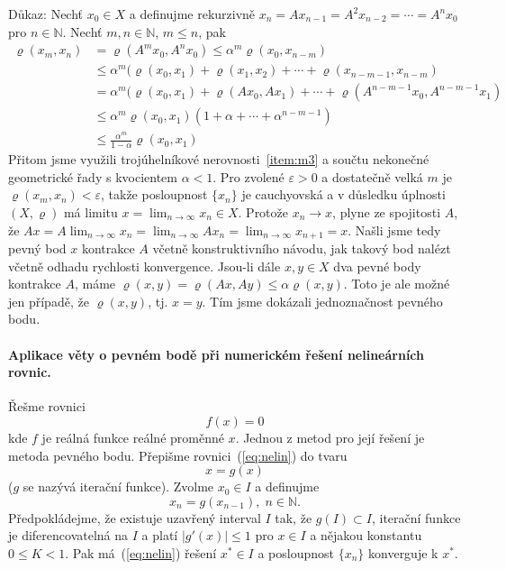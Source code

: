 Důkaz: Nechť $x_0\in X$ a definujme rekurzivně 
$x_n=Ax_{n-1}=A^2x_{n-2}=\cdots=A^nx_0$ pro $n\in\mathbb{N}$.
Nechť $m,n\in\mathbb{N}$, $m\leq n$, pak
\[
   \begin{split}
      \varrho(x_m,x_n)&=\varrho(A^mx_0,A^nx_0)\leq\alpha^m\varrho(x_0,x_{n-m})\\
                      &\leq\alpha^m(\varrho(x_0,x_1)+\varrho(x_1,x_2)+\cdots
                       +\varrho(x_{n-m-1},x_{n-m})\\
                      &=\alpha^m(\varrho(x_0,x_1)+\varrho(Ax_0,Ax_1)+\cdots
                       +\varrho(A^{n-m-1}x_0,A^{n-m-1}x_1)\\
                      &\leq\alpha^m\varrho(x_0,x_1)(1+\alpha+\cdots
                       +\alpha^{n-m-1})\\
                      &\leq\frac{\alpha^m}{1-\alpha}\varrho(x_0,x_1)
   \end{split}
\]
Přitom jsme využili trojúhelníkové nerovnosti~\ref{item:m3}
a součtu nekonečné geometrické řady s kvocientem $\alpha<1$.
Pro zvolené $\varepsilon>0$ a dostatečně velká $m$ je $\varrho(x_m,x_n)<\varepsilon$,
takže posloupnost $\{x_n\}$ je cauchyovská a v důsledku úplnosti $(X,\varrho)$
má limitu $x=\lim_{n\rightarrow\infty}x_n\in X$.
Protože $x_n\rightarrow x$, plyne ze spojitosti $A$, že
$Ax=A\lim_{n\rightarrow\infty}x_n=\lim_{n\rightarrow\infty}Ax_n
=\lim_{n\rightarrow\infty}x_{n+1}=x$.
Našli jsme tedy pevný bod $x$ kontrakce $A$ včetně konstruktivního návodu,
jak takový bod nalézt včetně odhadu rychlosti konvergence.
Jsou-li dále $x,y\in X$ dva pevné body kontrakce $A$, máme
$\varrho(x,y)=\varrho(Ax,Ay)\leq\alpha\varrho(x,y)$.
Toto je ale možné jen případě, že $\varrho(x,y)$, tj. $x=y$.
Tím jsme dokázali jednoznačnost pevného bodu.

\paragraph{Aplikace věty o pevném bodě při numerickém řešení nelineárních rovnic.}
Řešme rovnici 
\begin{equation}\label{eq:nelin}
   f(x)=0
\end{equation}
kde $f$ je reálná funkce reálné proměnné $x$.
Jednou z metod pro její řešení je metoda pevného bodu.
Přepišme rovnici~(\ref{eq:nelin}) do tvaru
\[
   x = g(x)
\]
($g$ se nazývá iterační funkce).
Zvolme $x_0\in I$ a definujme
\begin{equation}\label{eq:iter}
   x_n = g(x_{n-1}), \; n\in\mathbb{N}.
\end{equation}
Předpokládejme, že existuje uzavřený interval $I$ tak, že $g(I)\subset I$,
iterační funkce je diferencovatelná na $I$ a platí $|g'(x)|\leq 1$ pro $x\in I$
a nějakou konstantu $0\leq K<1$.
Pak má~(\ref{eq:nelin}) řešení $x^*\in I$ a posloupnost $\{x_n\}$ konverguje k $x^*$.

